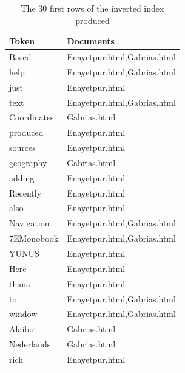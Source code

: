 \documentclass{article}
\begin{document}
		\begin{table}[h]
			\centering
			\caption{The 30 first rows of the inverted index produced}
			\label{tb:inv_index}
			\begin{tabular}{|l|l|}
				\hline
				\multicolumn{1}{|l|}{Token} & \multicolumn{1}{l|}{Documents} \\ \hline
				Based                       & Enayetpur.html,Gabrias.html    \\
				help                        & Enayetpur.html,Gabrias.html    \\
				just                        & Enayetpur.html                 \\
				text                        & Enayetpur.html,Gabrias.html    \\
				Coordinates                 & Gabrias.html                   \\
				produced                    & Enayetpur.html                 \\
				sources                     & Enayetpur.html                 \\
				geography                   & Gabrias.html                   \\
				adding                      & Enayetpur.html                 \\
				Recently                    & Enayetpur.html                 \\
				also                        & Enayetpur.html                 \\
				Navigation                  & Enayetpur.html,Gabrias.html    \\
				7EMonobook                  & Enayetpur.html,Gabrias.html    \\
				YUNUS                       & Enayetpur.html                 \\
				Here                        & Enayetpur.html                 \\
				thana                       & Enayetpur.html                 \\
				to                          & Enayetpur.html,Gabrias.html    \\
				window                      & Enayetpur.html,Gabrias.html    \\
				Alaibot                     & Gabrias.html                   \\
				Nederlands                  & Gabrias.html                   \\
				rich                        & Enayetpur.html                 \\

\end{tabular}
\end{table}
\end{document}
